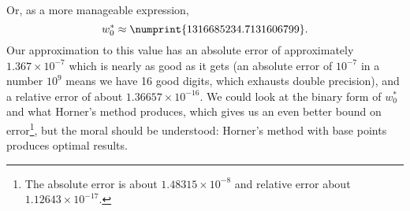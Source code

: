 \begin{ex}
Or, as a more manageable expression,
  \begin{equation}
    w_{0}^{*} \approx \numprint{1316685234.7131606799}.
  \end{equation}
  Our approximation to this value has an absolute error of approximately
  $1.367\times10^{-7}$ which is nearly as good as it gets (an absolute
  error of $10^{-7}$ in a number $10^{9}$ means we have 16 good digits,
  which exhausts double precision), and a relative error of about
  $1.36657\times10^{-16}$. We could look at the binary form of $w_{0}^{*}$
  and what Horner's method produces, which gives us an even better bound
  on error\footnote{The absolute error is about $1.48315\times 10^{-8}$ and
  relative error about $1.12643\times10^{-17}$.}, but the moral should be understood: Horner's method with
  base points produces optimal results.
\end{ex}
